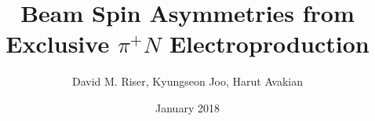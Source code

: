 \title{Beam Spin Asymmetries from Exclusive $\pi^{+} N$ Electroproduction}
\author{David M. Riser, Kyungseon Joo, Harut Avakian}
\date{January 2018}

